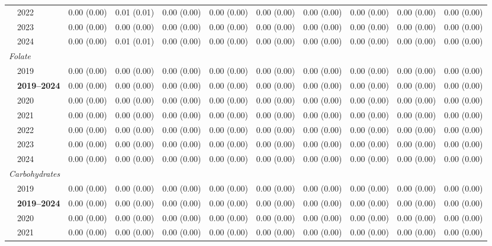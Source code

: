 \begin{table}[htbp]
\begin{tabular}{llrrrrrrrrr}
 & 2022 & 0.00 (0.00) & 0.01 (0.01) & 0.00 (0.00) & 0.00 (0.00) & 0.00 (0.00) & 0.00 (0.00) & 0.00 (0.00) & 0.00 (0.00) & 0.00 (0.00) \\
 & 2023 & 0.00 (0.00) & 0.00 (0.00) & 0.00 (0.00) & 0.00 (0.00) & 0.00 (0.00) & 0.00 (0.00) & 0.00 (0.00) & 0.00 (0.00) & 0.00 (0.00) \\
 & 2024 & 0.00 (0.00) & 0.01 (0.01) & 0.00 (0.00) & 0.00 (0.00) & 0.00 (0.00) & 0.00 (0.00) & 0.00 (0.00) & 0.00 (0.00) & 0.00 (0.00) \\
\midrule
\multicolumn{11}{l}{\textit{Folate}} \\
 & 2019 & 0.00 (0.00) & 0.00 (0.00) & 0.00 (0.00) & 0.00 (0.00) & 0.00 (0.00) & 0.00 (0.00) & 0.00 (0.00) & 0.00 (0.00) & 0.00 (0.00) \\
 & \textbf{2019–2024} & 0.00 (0.00) & 0.00 (0.00) & 0.00 (0.00) & 0.00 (0.00) & 0.00 (0.00) & 0.00 (0.00) & 0.00 (0.00) & 0.00 (0.00) & 0.00 (0.00) \\
 & 2020 & 0.00 (0.00) & 0.00 (0.00) & 0.00 (0.00) & 0.00 (0.00) & 0.00 (0.00) & 0.00 (0.00) & 0.00 (0.00) & 0.00 (0.00) & 0.00 (0.00) \\
 & 2021 & 0.00 (0.00) & 0.00 (0.00) & 0.00 (0.00) & 0.00 (0.00) & 0.00 (0.00) & 0.00 (0.00) & 0.00 (0.00) & 0.00 (0.00) & 0.00 (0.00) \\
 & 2022 & 0.00 (0.00) & 0.00 (0.00) & 0.00 (0.00) & 0.00 (0.00) & 0.00 (0.00) & 0.00 (0.00) & 0.00 (0.00) & 0.00 (0.00) & 0.00 (0.00) \\
 & 2023 & 0.00 (0.00) & 0.00 (0.00) & 0.00 (0.00) & 0.00 (0.00) & 0.00 (0.00) & 0.00 (0.00) & 0.00 (0.00) & 0.00 (0.00) & 0.00 (0.00) \\
 & 2024 & 0.00 (0.00) & 0.00 (0.00) & 0.00 (0.00) & 0.00 (0.00) & 0.00 (0.00) & 0.00 (0.00) & 0.00 (0.00) & 0.00 (0.00) & 0.00 (0.00) \\
\midrule
\multicolumn{11}{l}{\textit{Carbohydrates}} \\
 & 2019 & 0.00 (0.00) & 0.00 (0.00) & 0.00 (0.00) & 0.00 (0.00) & 0.00 (0.00) & 0.00 (0.00) & 0.00 (0.00) & 0.00 (0.00) & 0.00 (0.00) \\
 & \textbf{2019–2024} & 0.00 (0.00) & 0.00 (0.00) & 0.00 (0.00) & 0.00 (0.00) & 0.00 (0.00) & 0.00 (0.00) & 0.00 (0.00) & 0.00 (0.00) & 0.00 (0.00) \\
 & 2020 & 0.00 (0.00) & 0.00 (0.00) & 0.00 (0.00) & 0.00 (0.00) & 0.00 (0.00) & 0.00 (0.00) & 0.00 (0.00) & 0.00 (0.00) & 0.00 (0.00) \\
 & 2021 & 0.00 (0.00) & 0.00 (0.00) & 0.00 (0.00) & 0.00 (0.00) & 0.00 (0.00) & 0.00 (0.00) & 0.00 (0.00) & 0.00 (0.00) & 0.00 (0.00) \\

\end{tabular}
\end{table}
